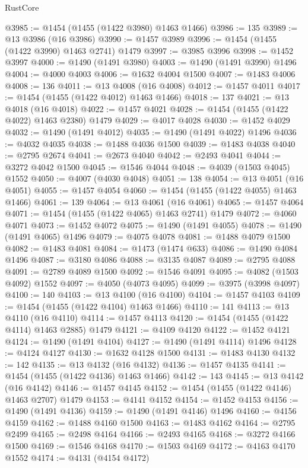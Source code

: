 \begin{lexlean}{RustCore}
\begin{coremodule}
@3985 := @1454 (@1455 (@1422 @3980) @1463 @1466)
@3986 := 135
@3989 := @13 @3986 (@16 @3986)
@3990 := @1457 @3989
@3996 := @1454 (@1455 (@1422 @3990) @1463 @2741) @1479
@3997 := @3985 @3996
@3998 := @1452 @3997
@4000 := @1490 (@1491 @3980)
@4003 := @1490 (@1491 @3990) @1496
@4004 := @4000 @4003
@4006 := @1632 @4004 @1500
@4007 := @1483 @4006
@4008 := 136
@4011 := @13 @4008 (@16 @4008)
@4012 := @1457 @4011
@4017 := @1454 (@1455 (@1422 @4012) @1463 @1466)
@4018 := 137
@4021 := @13 @4018 (@16 @4018)
@4022 := @1457 @4021
@4028 := @1454 (@1455 (@1422 @4022) @1463 @2380) @1479
@4029 := @4017 @4028
@4030 := @1452 @4029
@4032 := @1490 (@1491 @4012)
@4035 := @1490 (@1491 @4022) @1496
@4036 := @4032 @4035
@4038 := @1488 @4036 @1500
@4039 := @1483 @4038
@4040 := @2795 @2674
@4041 := @2673 @4040
@4042 := @2493 @4041
@4044 := @3272 @4042 @1500
@4045 := @1546 @4044
@4048 := @4039 (@1503 @4045) @1552
@4050 := @4007 (@4030 @4048)
@4051 := 138
@4054 := @13 @4051 (@16 @4051)
@4055 := @1457 @4054
@4060 := @1454 (@1455 (@1422 @4055) @1463 @1466)
@4061 := 139
@4064 := @13 @4061 (@16 @4061)
@4065 := @1457 @4064
@4071 := @1454 (@1455 (@1422 @4065) @1463 @2741) @1479
@4072 := @4060 @4071
@4073 := @1452 @4072
@4075 := @1490 (@1491 @4055)
@4078 := @1490 (@1491 @4065) @1496
@4079 := @4075 @4078
@4081 := @1488 @4079 @1500
@4082 := @1483 @4081
@4084 := @1473 (@1474 @633)
@4086 := @1490 @4084 @1496
@4087 := @3180 @4086
@4088 := @3135 @4087
@4089 := @2795 @4088
@4091 := @2789 @4089 @1500
@4092 := @1546 @4091
@4095 := @4082 (@1503 @4092) @1552
@4097 := @4050 (@4073 @4095)
@4099 := @3975 (@3998 @4097)
@4100 := 140
@4103 := @13 @4100 (@16 @4100)
@4104 := @1457 @4103
@4109 := @1454 (@1455 (@1422 @4104) @1463 @1466)
@4110 := 141
@4113 := @13 @4110 (@16 @4110)
@4114 := @1457 @4113
@4120 := @1454 (@1455 (@1422 @4114) @1463 @2885) @1479
@4121 := @4109 @4120
@4122 := @1452 @4121
@4124 := @1490 (@1491 @4104)
@4127 := @1490 (@1491 @4114) @1496
@4128 := @4124 @4127
@4130 := @1632 @4128 @1500
@4131 := @1483 @4130
@4132 := 142
@4135 := @13 @4132 (@16 @4132)
@4136 := @1457 @4135
@4141 := @1454 (@1455 (@1422 @4136) @1463 @1466)
@4142 := 143
@4145 := @13 @4142 (@16 @4142)
@4146 := @1457 @4145
@4152 := @1454 (@1455 (@1422 @4146) @1463 @2707) @1479
@4153 := @4141 @4152
@4154 := @1452 @4153
@4156 := @1490 (@1491 @4136)
@4159 := @1490 (@1491 @4146) @1496
@4160 := @4156 @4159
@4162 := @1488 @4160 @1500
@4163 := @1483 @4162
@4164 := @2795 @2499
@4165 := @2498 @4164
@4166 := @2493 @4165
@4168 := @3272 @4166 @1500
@4169 := @1546 @4168
@4170 := @1503 @4169
@4172 := @4163 @4170 @1552
@4174 := @4131 (@4154 @4172)

\end{coremodule}
\end{lexlean}
